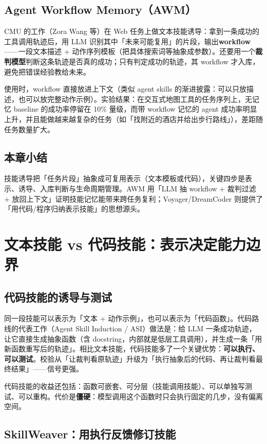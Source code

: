 ﻿\documentclass[a4paper]{article}
\begin{document}
\subsection{Agent Workflow Memory（AWM）}

CMU 的工作（Zora Wang 等）在 Web 任务上做文本技能诱导：拿到一条成功的工具调用轨迹后，用 LLM 识别其中「未来可能复用」的片段，输出\textbf{workflow}——一段文本描述 + 动作序列模板（把具体搜索词等抽象成参数）。还要用一个\textbf{裁判模型}判断这条轨迹是否真的成功；只有判定成功的轨迹，其 workflow 才入库，避免把错误经验教给未来。

使用时，workflow 直接放进上下文（类似 agent skills 的渐进披露：可以只放描述，也可以放完整动作示例）。实验结果：在交互式地图工具的任务序列上，无记忆 baseline 的成功率停留在 10\% 量级，而带 workflow 记忆的 agent 成功率明显上升，并且能做越来越复杂的任务（如「找附近的酒店并给出步行路线」），差距随任务数量扩大。

\subsection{本章小结}
技能诱导把「任务片段」抽象成可复用表示（文本模板或代码），关键四步是表示、诱导、入库判断与生命周期管理。AWM 用「LLM 抽 workflow + 裁判过滤 + 放回上下文」证明技能记忆能带来跨任务复利；Voyager/DreamCoder 则提供了「用代码/程序归纳表示技能」的思想源头。

\section{文本技能 vs 代码技能：表示决定能力边界}

\subsection{代码技能的诱导与测试}

同一段技能可以表示为「文本 + 动作示例」，也可以表示为「代码函数」。代码路线的代表工作（Agent Skill Induction / ASI）做法是：给 LLM 一条成功轨迹，让它直接生成抽象函数（含 docstring，内部就是低层工具调用），并生成一条「用新函数重写后的轨迹」。相比文本技能，代码技能多了一个关键优势：\textbf{可以执行、可以测试}。校验从「让裁判看原轨迹」升级为「执行抽象后的代码、再让裁判看最终结果」——信号更强。

代码技能的收益还包括：函数可嵌套、可分层（技能调用技能）、可以单独写测试、可以重构。代价是\textbf{僵硬}：模型调用这个函数时只会执行固定的几步，没有偏离空间。

\subsection{SkillWeaver：用执行反馈修订技能}
\end{document}
